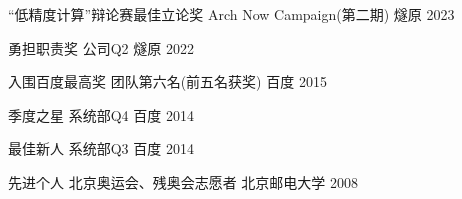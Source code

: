 
\begin{cvhonors}

  \cvhonor
    {“低精度计算”辩论赛最佳立论奖} %
    {Arch Now Campaign(第二期)} %
    {燧原} %
    {2023} %

  \cvhonor
    {勇担职责奖} %
    {公司Q2} %
    {燧原} %
    {2022} %

  \cvhonor
    {入围百度最高奖} %
    {团队第六名(前五名获奖)} %
    {百度} %
    {2015} %

  \cvhonor
    {季度之星} %
    {系统部Q4} %
    {百度} %
    {2014} %

  \cvhonor
    {最佳新人} %
    {系统部Q3} %
    {百度} %
    {2014} %

  \cvhonor
    {先进个人} %
    {北京奥运会、残奥会志愿者} %
    {北京邮电大学} %
    {2008} %

\end{cvhonors}
